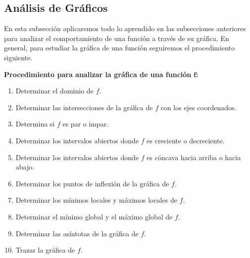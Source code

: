 \documentclass[12pt,a4paper]{book}
\newcommand{\receta}[1]{\par\addvspace{\medskipamount}#1\par\nobreak}
\begin{document}
    \subsection{Análisis de Gráficos}\label{subsec:graficos}

    En esta subsección aplicaremos todo lo aprendido en las subsecciones anteriores
    para analizar el comportamiento de una función a través de su gráfica.
    En general, para estudiar la gráfica de una función seguiremos el procedimiento
    siguiente.

    \receta{\textbf{Procedimiento para analizar la gráfica de una función} $\boldsymbol{f}$\textbf{:}}
    \begin{enumerate}[label=\arabic*.,nosep]
        \item Determinar el dominio de $f$.
        \item Determinar las intersecciones de la gráfica de $f$ con los ejes coordenados.
        \item Determina si $f$ es par o impar.
        \item Determinar los intervalos abiertos donde $f$ es creciente o decreciente.
        \item Determinar los intervalos abiertos donde $f$ es cóncava hacia arriba o hacia
        abajo.
        \item Determinar los puntos de inflexión de la gráfica de $f$.
        \item Determinar los mínimos locales y máximos locales de $f$.
        \item Determinar el mínimo global y el máximo global de $f$.
        \item Determinar las asíntotas de la gráfica de $f$.
        \item Trazar la gráfica de $f$.
    \end{enumerate}
\end{document}
